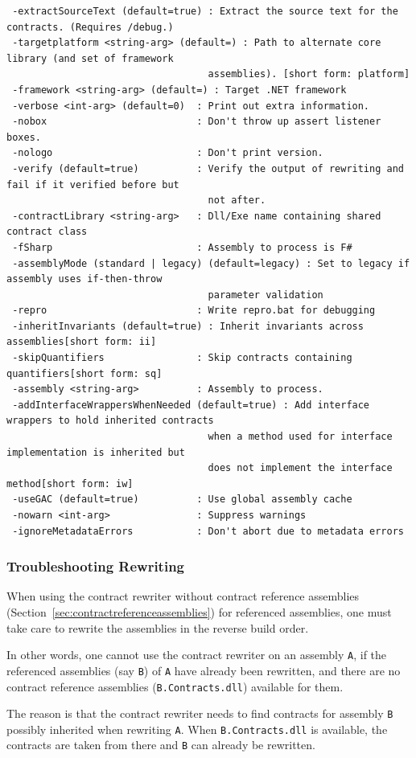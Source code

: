 \documentclass{article}
\newcommand{\code}[1]{\lstinline{#1}}
\begin{document}
{\begin{verbatim}
 -extractSourceText (default=true) : Extract the source text for the contracts. (Requires /debug.)
 -targetplatform <string-arg> (default=) : Path to alternate core library (and set of framework
                                   assemblies). [short form: platform]
 -framework <string-arg> (default=) : Target .NET framework
 -verbose <int-arg> (default=0)  : Print out extra information.
 -nobox                          : Don't throw up assert listener boxes.
 -nologo                         : Don't print version.
 -verify (default=true)          : Verify the output of rewriting and fail if it verified before but
                                   not after.
 -contractLibrary <string-arg>   : Dll/Exe name containing shared contract class
 -fSharp                         : Assembly to process is F#
 -assemblyMode (standard | legacy) (default=legacy) : Set to legacy if assembly uses if-then-throw
                                   parameter validation
 -repro                          : Write repro.bat for debugging
 -inheritInvariants (default=true) : Inherit invariants across assemblies[short form: ii]
 -skipQuantifiers                : Skip contracts containing quantifiers[short form: sq]
 -assembly <string-arg>          : Assembly to process.
 -addInterfaceWrappersWhenNeeded (default=true) : Add interface wrappers to hold inherited contracts
                                   when a method used for interface implementation is inherited but
                                   does not implement the interface method[short form: iw]
 -useGAC (default=true)          : Use global assembly cache
 -nowarn <int-arg>               : Suppress warnings
 -ignoreMetadataErrors           : Don't abort due to metadata errors
\end{verbatim}
}
\subsubsection{Troubleshooting Rewriting}
When using the contract rewriter without contract reference assemblies
(Section~\ref{sec:contractreferenceassemblies}) for referenced
assemblies, one must take care to rewrite the assemblies in the
reverse build order.

In other words, one cannot use the contract rewriter on an assembly \code{A}, if the
referenced assemblies (say \code{B}) of \code{A} have already been rewritten, and
there are no contract reference assemblies (\code{B.Contracts.dll}) available
for them. 

The reason is that the contract rewriter needs to find contracts for assembly
\code{B} possibly inherited when rewriting \code{A}. When
\code{B.Contracts.dll} is available, the contracts are taken from there and \code{B} can already be rewritten.
\end{document}
